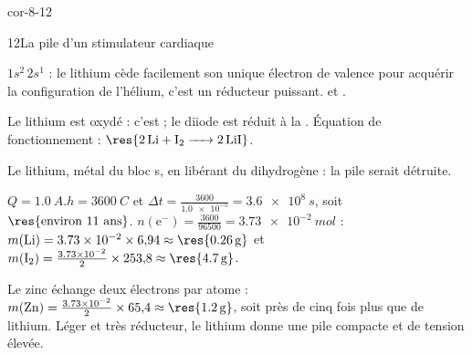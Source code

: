 \begin{blocLivre}{cor-8-12}
\begin{corrige}{12}{La pile d'un stimulateur cardiaque}
\begin{questions}
\item $1s^2\,2s^1$ : le lithium cède facilement son unique électron de valence pour acquérir la configuration de
l'hélium, c'est un réducteur puissant.  et .
\item Le lithium est oxydé : c'est  ; le diiode est réduit à la .
Équation de fonctionnement : $\res{\ce{2 Li + I2 -> 2 LiI}}$.
\item Le lithium, métal du bloc s,  en libérant du dihydrogène : la pile serait détruite.
\item $Q=\qty{1,0}{A.h}=\qty{3600}{C}$ et $\Delta t=\frac{3600}{\num{1.0e-5}}=\qty{3,6e8}{s}$, soit $\res{\text{environ 11 ans}}$.
$n(\mathrm{e}^-)=\frac{3600}{96500}=\qty{3,73e-2}{mol}$ : $m(\ce{Li})=\num{3.73e-2}\times6{,}94\approx\res{\qty{0,26}{g}}$ et
$m(\ce{I2})=\frac{\num{3.73e-2}}{2}\times253{,}8\approx\res{\qty{4,7}{g}}$.
\item Le zinc échange deux électrons par atome : $m(\ce{Zn})=\frac{\num{3.73e-2}}{2}\times65{,}4\approx\res{\qty{1,2}{g}}$, soit près de
cinq fois plus que de lithium. Léger et très réducteur, le lithium donne une pile compacte et de tension élevée.
\end{questions}
\end{corrige}
\end{blocLivre}
